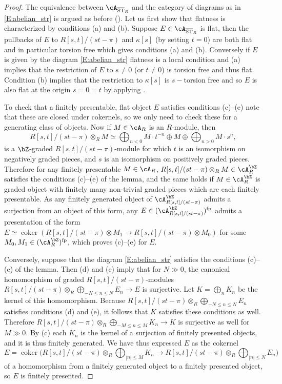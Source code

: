 \documentclass[a4paper]{amsart}
\numberwithin{equation}{section}
\theoremstyle{plain}
\theoremstyle{definition}
\DeclareMathOperator{\ST}{ST}
\DeclareMathOperator{\coker}{coker}
\def\oST{\overline{\ST}}
\begin{document}
\begin{proof}  
	The equivalence between $\cA_{\oST_R}$ and the category of diagrams as in \eqref{E:abelian_str} is argued as before (). 
	Let us first show that flatness is characterized by conditions (a) and (b). 
	Suppose $E \in \cA_{\oST_R}$ is flat, then the pullbacks of $E$ to $R[s,t]/(st-\pi)$ and $\kappa[s]$ (by setting $t=0$) are both flat and in particular torsion free which gives conditions (a) and (b). Conversely if $E$ is given by the diagram \eqref{E:abelian_str} flatness is a local condition and (a) implies that the restriction of $E$ to $s\neq 0$ (or $t\neq 0$) is torsion free and thus flat. Condition (b) implies that the restriction to $\kappa[s]$ is $s-$torsion free and so $E$ is also flat at the origin $s=0=t$ by applying  \cite[Lem.~C1.12]{artin-zhang}.
	
	To check that a finitely presentable, flat object $E$ satisfies conditions (c)--(e) note that these are closed under cokernels, so we only need to check these for a generating class of objects.
	Now if $M \in \cA_R$ is an $R$-module, then
	\[
	R[s,t]/(st-\pi) \otimes_R M \simeq \bigoplus_{n<0} M \cdot t^{-n} \oplus M \oplus \bigoplus_{n>0} M \cdot s^n,
	\]
	is a $\bZ$-graded $R[s,t]/(st-\pi)$-module for which $t$ is an isomorphism on negatively graded pieces, and $s$ is an isomorphism on positively graded pieces. Therefore for any finitely presentable $M \in \cA_R$, $R[s,t]/(st-\pi) \otimes_R M\in \cA_R^{\bZ}$ satisfies the conditions (c)--(e) of the lemma, and the same holds if $M \in \cA_R^\bZ$ is graded object with finitely many non-trivial graded pieces which are each finitely presentable. {As any finitely generated object of $\cA^\bZ_{R[s,t]/(st-\pi)}$ admits a surjection from an object of this form,} any $E \in (\cA^\bZ_{R[s,t]/(st-\pi)})^{\rm{fp}}$ admits a presentation of the form $E \simeq \coker(R[s,t]/(st-\pi) \otimes M_1 \to R[s,t]/(st-\pi) \otimes M_0)$ for some $M_0,M_1 \in (\cA^\bZ_R)^{\rm{fp}}$, which proves (c)--(e) for $E$.

Conversely, suppose that the diagram \eqref{E:abelian_str} satisfies the conditions (c)--(e) of the lemma. Then (d) and (e) imply that for $N \gg 0$, the canonical homomorphism of graded $R[s,t]/(st-\pi)$-modules $R[s,t] / (st-\pi) \otimes_R \bigoplus_{-N\leq n \leq N} E_n \to E$ is surjective. Let $K = \bigoplus_n K_n$ be the kernel of this homomorphism. Because $R[s,t] / (st-\pi) \otimes_R \bigoplus_{-N\leq n \leq N} E_n$ satisfies conditions (d) and (e), it follows that $K$ satisfies these conditions as well. Therefore $R[s,t]/(st-\pi) \otimes_R \bigoplus_{-M \leq n \leq M} K_n \to K$ is surjective as well for $M \gg 0$. By (c) each $K_n$ is the kernel of a surjection of finitely presented objects, and it is thus finitely generated. We have thus expressed $E$ as the cokernel
\[
E = \coker \big(R[s,t]/(st-\pi) \otimes_R \bigoplus_{|n| \leq M} K_n \to R[s,t] / (st-\pi) \otimes_R \bigoplus_{|n| \leq N} E_n \big)
\]
of a homomorphism from a finitely generated object to a finitely presented object, so $E$ is finitely presented.
\end{proof}
\end{document}
